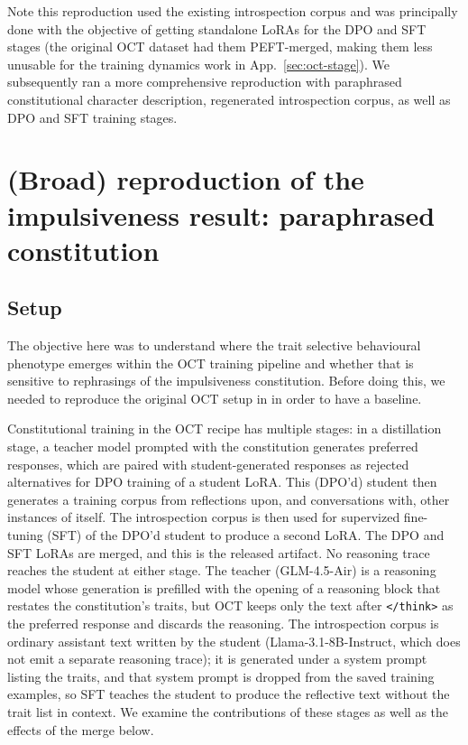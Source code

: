 \documentclass{article}
\begin{document}
Note this reproduction used the existing introspection corpus and was principally done with the objective of getting standalone LoRAs for the DPO and SFT stages (the original OCT dataset had them PEFT-merged, making them less unusable for the training dynamics work in App.~\ref{sec:oct-stage}). We subsequently ran a more comprehensive reproduction with paraphrased constitutional character description, regenerated introspection corpus, as well as DPO and SFT training stages.

\section{(Broad) reproduction of the impulsiveness result: paraphrased constitution}
\label{app:impulsive-paraphrase}

\subsection{Setup}

The objective here was to understand where the trait selective behavioural phenotype emerges within the OCT training pipeline and whether that is sensitive to rephrasings of the impulsiveness constitution. Before doing this, we needed to reproduce the original OCT setup in \citep{maiya2025opencharactertrainingshaping} in order to have a baseline.

Constitutional training in the OCT recipe \citep{maiya2025opencharactertrainingshaping} has multiple stages: in a distillation stage, a teacher model prompted with the constitution generates preferred responses, which are paired with student-generated responses as rejected alternatives for DPO training of a student LoRA. This (DPO'd) student then generates a training corpus from reflections upon, and conversations with, other instances of itself. The introspection corpus is then used for supervized fine-tuning (SFT) of the DPO'd student to produce a second LoRA. The DPO and SFT LoRAs are merged, and this is the released artifact. No reasoning trace reaches the student at either stage. The teacher (GLM-4.5-Air) is a reasoning model whose generation is prefilled with the opening of a reasoning block that restates the constitution's traits, but OCT keeps only the text after \texttt{</think>} as the preferred response and discards the reasoning. The introspection corpus is ordinary assistant text written by the student (Llama-3.1-8B-Instruct, which does not emit a separate reasoning trace); it is generated under a system prompt listing the traits, and that system prompt is dropped from the saved training examples, so SFT teaches the student to produce the reflective text without the trait list in context. We examine the contributions of these stages as well as the effects of the merge below.
\end{document}
